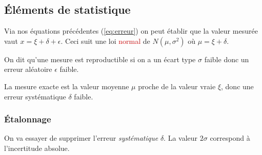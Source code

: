 \documentclass{report}
\begin{document}
\subsection{Éléments de statistique}
Via nos équations précédentes (\ref{eq:erreur}) on peut établir que la valeur mesurée vaut $x = \xi + \delta + \epsilon$. Ceci suit une loi \textcolor{red}{normal} de $N(\mu , \sigma^2)$ où $\mu = \xi + \delta $.\par 
On dit qu'une mesure est reproductible si on a un écart type $\sigma$ faible donc un erreur aléatoire $\epsilon $ faible.\par 
La mesure exacte est la valeur moyenne $\mu$ proche de la valeur vraie $\xi$, donc une erreur systématique $\delta$ faible.

\subsubsection{Étalonnage}
On va essayer de supprimer l'erreur \textit{systématique} $\delta$. La valeur $2 \sigma$ correspond à l'incertitude absolue.
\end{document}

